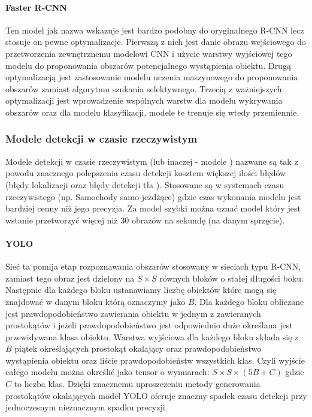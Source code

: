 \paragraph{Faster R-CNN}
Ten model jak nazwa wskazuje jest bardzo podobny do oryginalnego R-CNN lecz stosuje on pewne optymalizacje. Pierwszą z nich jest danie obrazu wejściowego do przetworzenia zewnętrznemu modelowi CNN i użycie warstwy wyjściowej tego modelu do proponowania obszarów potencjalnego wystąpienia obiektu. Drugą optymalizacją jest zastosowanie modelu uczenia maszynowego do proponowania obszarów zamiast algorytmu szukania selektywnego.\cite{ORdum-1} Trzecią z ważniejszych optymalizacji jest wprowadzenie wspólnych warstw dla modelu wykrywania obszarów oraz dla modelu klasyfikacji, modele te trenuje się wtedy przemiennie. \cite{ORdum-3}

\subsubsection{Modele detekcji w czasie rzeczywistym}
Modele detekcji w czasie rzeczywistym (lub inaczej - modele ) nazwane są tak z powodu znacznego polepszenia czasu detekcji kosztem większej ilości błędów (błędy lokalizacji oraz błędy detekcji tła \cite[p.~6]{YOLOnet}). Stosowane są w systemach czasu rzeczywistego (np. Samochody samo-jeżdżące) gdzie czas wykonania modelu jest bardziej cenny niż jego precyzja. Za model szybki można uznać model który jest wstanie przetworzyć więcej niż 30 obrazów na sekundę (na danym sprzęcie).\cite[p.~5]{YOLOnet}
\paragraph{YOLO}
Sieć ta pomija etap rozpoznawania obszarów stosowany w sieciach typu R-CNN, zamiast tego obraz jest dzielony na $S \times S$ równych bloków o stałej długości boku. Następnie dla każdego bloku ustanawiamy liczbę obiektów które mogą się znajdować w danym bloku którą oznaczymy jako $B$. Dla każdego bloku obliczane jest prawdopodobieństwo zawierania obiektu w jednym z zawieranych prostokątów i jeżeli prawdopodobieństwo jest odpowiednio duże określana jest przewidywana klasa obiektu. Warstwa wyjściowa dla każdego bloku składa się z $B$ piątek określających prostokąt okalający oraz prawdopodobieństwo wystąpienia obiektu oraz liście prawdopodobieństw wszystkich klas. Czyli wyjście całego modelu można określić jako tensor o wymiarach: $S \times S \times (5B+C)$ gdzie $C$ to liczba klas.\cite{ORdum-4} Dzięki znacznemu uproszczeniu metody generowania prostokątów okalających model YOLO oferuje znaczny spadek czasu detekcji przy jednoczesnym nieznacznym spadku precyzji. \cite{YOLOnet} 
